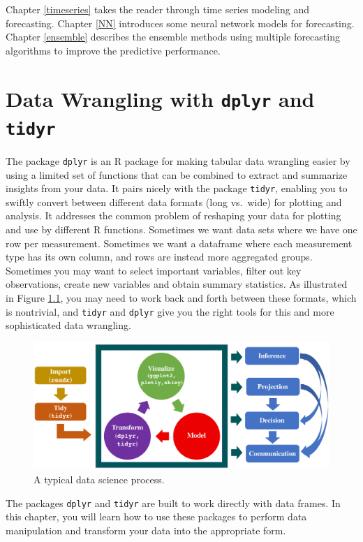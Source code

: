 \documentclass[]{book}
\begin{document}
Chapter \ref{timeseries} takes the reader through time series modeling
and forecasting. Chapter \ref{NN} introduces some neural network models
for forecasting. Chapter \ref{ensemble} describes the ensemble methods
using multiple forecasting algorithms to improve the predictive
performance.

\chapter{\texorpdfstring{Data Wrangling with \texttt{dplyr} and
\texttt{tidyr}}{Data Wrangling with dplyr and tidyr}}\label{dplyr}

The package \texttt{dplyr} is an R package for making tabular data
wrangling easier by using a limited set of functions that can be
combined to extract and summarize insights from your data. It pairs
nicely with the package \texttt{tidyr}, enabling you to swiftly convert
between different data formats (long vs.~wide) for plotting and
analysis. It addresses the common problem of reshaping your data for
plotting and use by different R functions. Sometimes we want data sets
where we have one row per measurement. Sometimes we want a dataframe
where each measurement type has its own column, and rows are instead
more aggregated groups. Sometimes you may want to select important
variables, filter out key observations, create new variables and obtain
summary statistics. As illustrated in Figure \ref{fig:process1}, you may
need to work back and forth between these formats, which is nontrivial,
and \texttt{tidyr} and \texttt{dplyr} give you the right tools for this
and more sophisticated data wrangling.

\begin{figure}

{\centering \includegraphics[width=0.75\linewidth]{figures/process_new} 

}

\caption{A typical data science process.}\label{fig:process1}
\end{figure}

The packages \texttt{dplyr} and \texttt{tidyr} are built to work
directly with data frames. In this chapter, you will learn how to use
these packages to perform data manipulation and transform your data into
the appropriate form.
\end{document}
